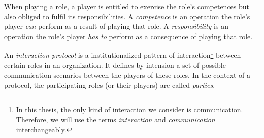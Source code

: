 When playing a role, a player is entitled to exercise the role's competences but also obliged to fulfil its responsibilities.
A \textit{competence} is an operation the role's player \textit{can} perform as a result of playing that role.
A \textit{responsibility} is an operation the role's player \textit{has to} perform as a consequence of playing that role.

An \textit{interaction protocol} is a institutionalized pattern of interaction\footnote{In this thesis, the only kind of interaction we consider is communication. Therefore, we will use the terms \textit{interaction} and \textit{communication} interchangeably.} between certain roles in an organization.
It defines by intension a set of possible communication scenarios between the players of these roles.
In the context of a protocol, the participating roles (or their players) are called \textit{parties}.